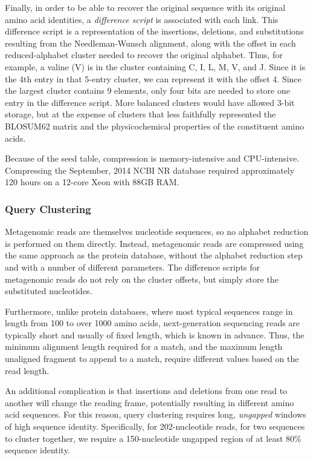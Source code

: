 \documentclass[review,preprint,12pt]{elsarticle}
\theoremstyle{definition}
\theoremstyle{remark}
\begin{document}
Finally, in order to be able to recover the original sequence with its original
amino acid identities, a \textit{difference script} is associated with each
link.
This difference script is a representation of the insertions, deletions, and
substitutions resulting from the Needleman-Wunsch alignment, along with the
offset in each reduced-alphabet cluster needed to recover the original alphabet.
Thus, for example, a valine (V) is in the cluster containing C, I, L, M, V, and 
J.
Since it is the 4th entry in that 5-entry cluster, we can represent it with
the offset 4.
Since the largest cluster contains 9 elements, only four bits are needed to
store one entry in the difference script.
More balanced clusters would have allowed 3-bit storage, but at the expense of
clusters that less faithfully represented the BLOSUM62 matrix and the
physicochemical properties of the constituent amino acids.

Because of the seed table, compression is memory-intensive and CPU-intensive.
Compressing the September, 2014 NCBI NR database required approximately 120 hours on a 12-core Xeon with 88GB RAM.



\subsubsection{Query Clustering}

Metagenomic reads are themselves nucleotide sequences, so no alphabet reduction
is performed on them directly.
Instead, metagenomic reads are compressed using the same approach as the
protein database, without the alphabet reduction step and with a number of
different parameters.
The difference scripts for metagenomic reads do not rely on the cluster offsets,
but simply store the substituted nucleotides.

Furthermore, unlike protein databases, where most typical sequences range in 
length from 100 to over 1000 amino acids, next-generation sequencing reads are 
typically short and usually of fixed length, which is known in advance.
Thus, the minimum alignment length required for a match, and the maximum
length unaligned fragment to append to a match, require different values based
on the read length.

An additional complication is that insertions and deletions from one read to
another will change the reading frame, potentially resulting in 
different amino acid sequences.
For this reason, query clustering requires long, \emph{ungapped} windows of high
sequence identity.
Specifically, for 202-nucleotide reads, for two sequences to cluster together,
we require a 150-nucleotide ungapped region of at least 80\% sequence identity.
\end{document}
